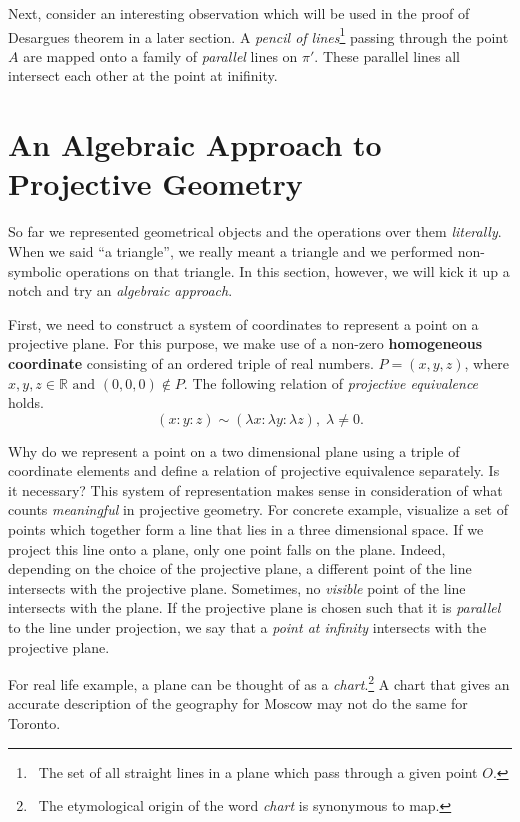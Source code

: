 Next, consider an interesting observation which will be used in the proof of Desargues theorem in a later section. A \emph{pencil of lines}\footnote{\ The set of all straight lines in a plane which pass through a given point $O$.} passing through the point $A$ are mapped onto a family of \emph{parallel} lines on $\pi'$. These parallel lines all intersect each other at the point at inifinity. %

\section{An Algebraic Approach to Projective Geometry}
So far we represented geometrical objects and the operations over them \emph{literally}. When we said ``a triangle'', we really meant a triangle and we performed non-symbolic operations on that triangle. In this section, however, we will kick it up a notch and try an \emph{algebraic approach}. 

First, we need to construct a system of coordinates to represent a point on a projective plane. For this purpose, we make use of a non-zero \textbf{homogeneous coordinate} consisting of an ordered triple of real numbers. $P = (x,y,z)$, where $ x,y,z \in \mathbb{R}\mbox{ and }(0,0,0)\notin P$. The following relation of \emph{projective equivalence} holds. \[
(x:y:z) \sim (\lambda x: \lambda y: \lambda z), \; \lambda \neq 0.\]


Why do we represent a point on a two dimensional plane using a triple of coordinate elements and define a relation of projective equivalence separately. Is it necessary? This system of representation makes sense in consideration of what counts \emph{meaningful} in projective geometry. For concrete example, visualize a set of points which together form a line that lies in a three dimensional space. If we project this line onto a plane, only one point falls on the plane. Indeed, depending on the choice of the projective plane, a different point of the line intersects with the projective plane. Sometimes, no \emph{visible} point of the line intersects with the plane. If the projective plane is chosen such that it is \emph{parallel} to the line under projection, we say that a \emph{point at infinity} intersects with the projective plane.

For real life example, a plane can be thought of as a \emph{chart}.\footnote{\ The etymological origin of the word \textit{chart} is synonymous to map.} A chart that gives an accurate description of the geography for Moscow may not do the same for Toronto. 


